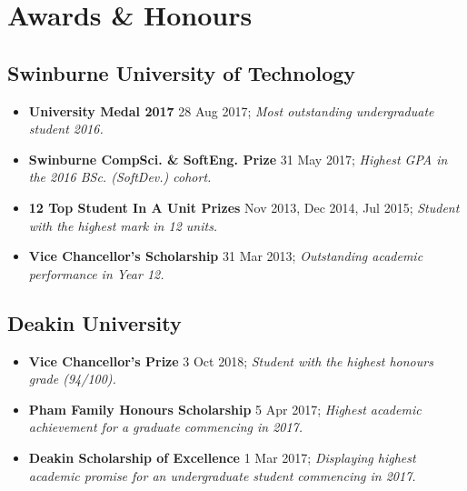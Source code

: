 \vspace{-3mm}
\section{Awards \& Honours}
\small

\begin{multicols}{2}
\raggedright

\subsection{Swinburne University of Technology}

\begin{itemize}
  \item \textbf{University Medal 2017} 28 Aug 2017; \textit{Most outstanding undergraduate student 2016.}
  \item \textbf{Swinburne CompSci. \& SoftEng. Prize} 31 May 2017; \textit{Highest GPA in the 2016 BSc. (SoftDev.) cohort.}
  \item \textbf{12 Top Student In A Unit Prizes} Nov 2013, Dec 2014, Jul 2015; \textit{Student with the highest mark in 12 units.}
  \item \textbf{Vice Chancellor's Scholarship} 31 Mar 2013; \textit{Outstanding academic performance in Year 12.}
\end{itemize}

\subsection{Deakin University}

\begin{itemize}
  \item \textbf{Vice Chancellor's Prize} 3 Oct 2018; \textit{Student with the highest honours grade (94/100).}
  \item \textbf{Pham Family Honours Scholarship} 5 Apr 2017; \textit{Highest academic achievement for a graduate commencing in 2017.}
  \item \textbf{Deakin Scholarship of Excellence} 1 Mar 2017; \textit{Displaying highest academic promise for an undergraduate student commencing in 2017.}
\end{itemize}


\end{multicols}
